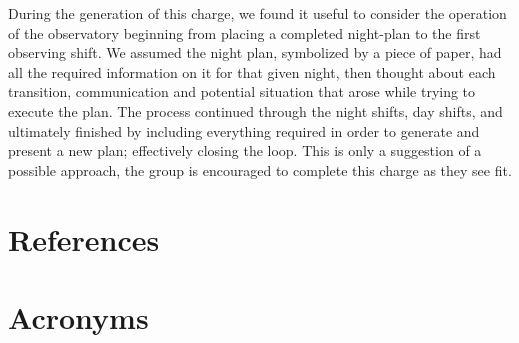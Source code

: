 \documentclass[SE,authoryear,toc]{lsstdoc}
\begin{document}
During the generation of this charge, we found it useful to consider the operation of the observatory beginning from placing a completed night-plan to the first observing shift. 
We assumed the night plan, symbolized by a piece of paper, had all the required information on it for that given night, then thought about each transition, communication and potential situation that arose while trying to execute the plan. 
The process continued through the night shifts, day shifts, and ultimately finished by including everything required in order to generate and present a new plan; effectively closing the loop. 
This is only a suggestion of a possible approach, the group is encouraged to complete this charge as they see fit.


\appendix
\section{References} \label{sec:bib}
\renewcommand{\refname}{} %


\section{Acronyms} \label{sec:acronyms}

\end{document}

